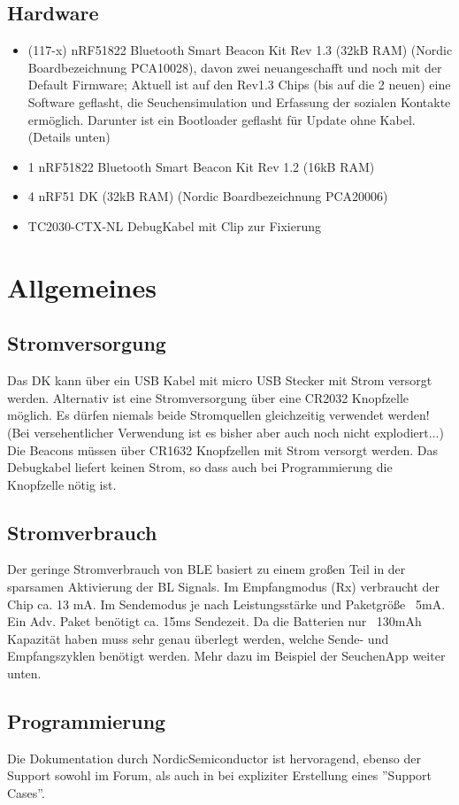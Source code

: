 \documentclass[11pt,ngerman]{scrartcl} %
\begin{document}
\subsection{Hardware}
\begin{itemize}
\item (117-x) nRF51822 Bluetooth Smart Beacon Kit Rev 1.3 (32kB RAM) (Nordic Boardbezeichnung PCA10028), davon zwei neuangeschafft und noch mit der Default Firmware; Aktuell ist auf den Rev1.3 Chips (bis auf die 2 neuen) eine Software geflasht, die Seuchensimulation und Erfassung der sozialen Kontakte ermöglich. Darunter ist ein Bootloader geflasht für Update ohne Kabel. (Details unten)
\item 1 nRF51822 Bluetooth Smart Beacon Kit Rev 1.2 (16kB RAM)
\item 4 nRF51 DK (32kB RAM) (Nordic Boardbezeichnung PCA20006)
\item TC2030-CTX-NL  DebugKabel mit Clip zur Fixierung
\end{itemize}
\section{Allgemeines}
\subsection{Stromversorgung}
Das DK kann über ein USB Kabel mit micro USB Stecker mit Strom versorgt werden. Alternativ ist eine Stromversorgung über eine CR2032 Knopfzelle möglich. Es dürfen niemals beide Stromquellen gleichzeitig verwendet werden! (Bei versehentlicher Verwendung ist es bisher aber auch noch nicht explodiert...)
Die Beacons müssen über CR1632 Knopfzellen mit Strom versorgt werden. Das Debugkabel liefert keinen Strom, so dass auch bei Programmierung die Knopfzelle nötig ist.

\subsection{Stromverbrauch}
Der geringe Stromverbrauch von BLE basiert zu einem großen Teil in der sparsamen Aktivierung der BL Signals. Im Empfangmodus (Rx) verbraucht der Chip ca. 13 mA. Im Sendemodus je nach Leistungsstärke und Paketgröße ~5mA. Ein Adv. Paket benötigt ca. 15ms Sendezeit. Da die Batterien nur ~130mAh Kapazität haben muss sehr genau überlegt werden, welche Sende- und Empfangszyklen benötigt werden. Mehr dazu im Beispiel der SeuchenApp weiter unten.
\subsection{Programmierung}
Die Dokumentation durch NordicSemiconductor ist hervoragend, ebenso der Support sowohl im Forum, als auch in bei expliziter Erstellung eines ''Support Cases''. 
\end{document}
